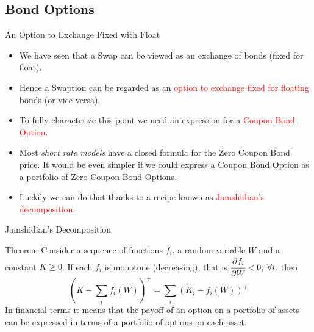 \documentclass{beamer}
\begin{document}

\subsection{Bond Options}
\begin{frame}{An Option to Exchange Fixed with Float}
\begin{itemize}
	\item<1-> We have seen that a Swap can be viewed as an exchange of bonds (fixed for float).
	\item<2-> Hence a Swaption can be regarded as an \textcolor{red}{option to exchange fixed for floating} bonds (or vice versa).
	\item<3-> To fully characterize this point we need an expression for a \textcolor{red}{Coupon Bond Option}.
	\item <4-> Most \emph{short rate models} have a closed formula for the Zero Coupon Bond price. It would be even simpler if we could express a Coupon Bond Option as a portfolio of Zero Coupon Bond Options.
	\item<5-> Luckily we can do that thanks to a recipe known as \textcolor{red}{Jamshidian's decomposition}.
\end{itemize}
\end{frame}

\begin{frame}{Jamshidian's Decomposition}
\begin{block}{Theorem}
	Consider a sequence of functions $f_i$, a random variable $W$ and a constant $K\ge0$. If each $f_i$ is monotone (decreasing), that is $\cfrac{\partial f_i}{\partial W} < 0;\;\forall i$, then 
	\begin{equation*}
		\left(K - \sum_i f_i(W)\right)^+ = 	\sum_i \left(K_i - f_i(W)\right)^+
	\end{equation*} 
	In financial terms it means that the payoff of an option on a portfolio of assets can be expressed in terms of a portfolio of options on each asset.
\end{block}
\end{frame}
\end{document}
